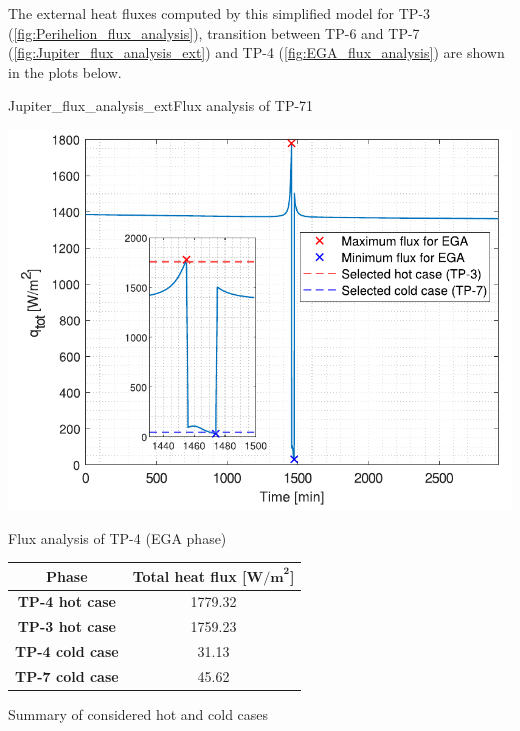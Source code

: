 The external heat fluxes computed by this simplified model for TP-3 (\autoref{fig:Perihelion_flux_analysis}), transition between TP-6 and TP-7 (\autoref{fig:Jupiter_flux_analysis_ext}) and TP-4 (\autoref{fig:EGA_flux_analysis}) are shown in the plots below.

    {Jupiter_flux_analysis_ext}{Flux analysis of TP-7}{1}

\begin{minipage}{0.5\linewidth}
    \centering
    \captionsetup{type=figure}
    \includegraphics[width=\linewidth]{Images/EGA_flux_analysis.pdf}
    \caption{Flux analysis of TP-4 (EGA phase)}
    \label{fig:EGA_flux_analysis}
\end{minipage}\hfill
\begin{minipage}{0.5\linewidth}
    \centering
    \captionsetup{type=table}
    \renewcommand{\arraystretch}{1.4}
    \begin{tabular}{|c|c|}
        \hline
        \textbf{Phase} &
        \textbf{Total heat flux [$\boldsymbol{\textbf{W/m}^2}$]} \\
        \hline
        \hline
        \textbf{TP-4 hot case}      & 1779.32   \\
        \hline
        \textbf{TP-3 hot case}      & 1759.23   \\
        \hline
        \hline
        \textbf{TP-4 cold case}     & 31.13     \\
        \hline
        \textbf{TP-7 cold case}     & 45.62     \\
        \hline
    \end{tabular}
    \caption{Summary of considered hot and cold cases}
    \label{table:cases}
\end{minipage}

